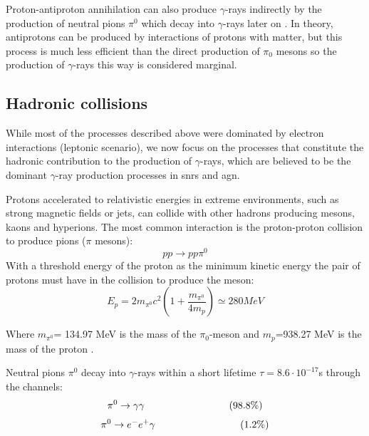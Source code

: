 \documentclass[main.tex]{subfiles}
\begin{document}
Proton-antiproton annihilation can also produce $\gamma$-rays indirectly by the production of neutral pions $\pi^0$ which decay into $\gamma$-rays later on \cite{1967protonantiproton}. In theory, antiprotons can be produced by interactions of protons with matter, but this process is much less efficient than the direct production of $\pi_0$ mesons \cite{weekes2003HEAstrophy} so the production of $\gamma$-rays this way is considered marginal. 

\subsection{Hadronic collisions}

While most of the processes described above were dominated by electron interactions (leptonic scenario), we now focus on the processes that constitute the hadronic contribution to the production of $\gamma$-rays, which are believed to be the dominant $\gamma$-ray production processes in \glspl{snr} and \gls{agn}. 

Protons accelerated to relativistic energies in extreme environments, such as strong magnetic fields or jets, can collide with other hadrons producing mesons, kaons and hyperions. The most common interaction is the proton-proton collision to produce pions ($\pi$ mesons):
\begin{equation}
    pp \rightarrow pp \pi^{0}
\end{equation}
With a threshold energy of the proton as the minimum kinetic energy the pair of protons must have in the collision to produce the meson:
\begin{equation}
    E_{p} = 2m_{\pi^{0}}c^{2}\left(1+\frac{m_{\pi^{0}}}{4m_{p}} \right) \simeq 280 MeV
\end{equation}

Where $m_{\pi^{0}}$= 134.97 MeV is the mass of the $\pi_{0}$-meson and $m_p$=938.27 MeV is the mass of the proton \cite{2004VHECosmicGammaRadiation}. 

Neutral pions $\pi^{0}$ decay into $\gamma$-rays within a short lifetime $\tau = 8.6 \cdot 10^{-17}$s through the channels:
\begin{equation}
    \pi^{0} \rightarrow \gamma\gamma 
    \\ \hspace{3cm}(98.8 \%)
\end{equation}
\begin{equation}
    \pi^{0} \rightarrow e^{-}e^{+}\gamma 
    \\ {}\hspace{3cm}(1.2 \%)
\end{equation}
\end{document}
